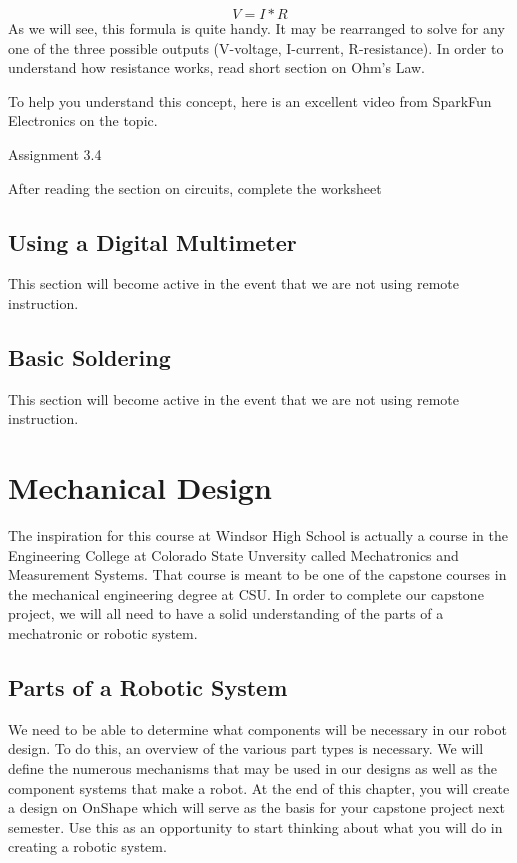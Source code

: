 \documentclass[
]{book}
\begin{document}
\[V = I * R\]
As we will see, this formula is quite handy. It may be rearranged to solve for any one of the three possible outputs (V-voltage, I-current, R-resistance). In order to understand how resistance works, read short section on Ohm's Law.

To help you understand this concept, here is an excellent video from SparkFun Electronics on the topic.

Assignment 3.4

After reading the section on circuits, complete the worksheet

\hypertarget{using-a-digital-multimeter}{%
\section{Using a Digital Multimeter}\label{using-a-digital-multimeter}}

This section will become active in the event that we are not using remote instruction.

\hypertarget{basic-soldering}{%
\section{Basic Soldering}\label{basic-soldering}}

This section will become active in the event that we are not using remote instruction.

\hypertarget{mechanical-design}{%
\chapter{Mechanical Design}\label{mechanical-design}}

The inspiration for this course at Windsor High School is actually a course in the Engineering College at Colorado State Unversity called Mechatronics and Measurement Systems. That course is meant to be one of the capstone courses in the mechanical engineering degree at CSU. In order to complete our capstone project, we will all need to have a solid understanding of the parts of a mechatronic or robotic system.

\hypertarget{parts-of-a-robotic-system}{%
\section{Parts of a Robotic System}\label{parts-of-a-robotic-system}}

We need to be able to determine what components will be necessary in our robot design. To do this, an overview of the various part types is necessary. We will define the numerous mechanisms that may be used in our designs as well as the component systems that make a robot. At the end of this chapter, you will create a design on OnShape which will serve as the basis for your capstone project next semester. Use this as an opportunity to start thinking about what you will do in creating a robotic system.
\end{document}
